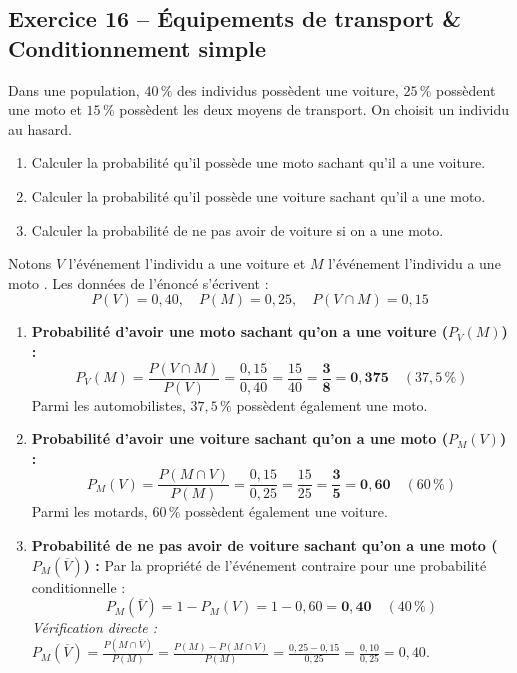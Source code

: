 \documentclass[11pt,a4paper]{article}
\begin{document}
\subsection*{Exercice 16 -- Équipements de transport \& Conditionnement simple}

Dans une population, $40\,\%$ des individus possèdent une voiture, $25\,\%$ possèdent une moto et $15\,\%$ possèdent les deux moyens de transport.
On choisit un individu au hasard.
\begin{enumerate}[label=\arabic*.]
    \item Calculer la probabilité qu'il possède une moto sachant qu'il a une voiture.
    \item Calculer la probabilité qu'il possède une voiture sachant qu'il a une moto.
    \item Calculer la probabilité de ne pas avoir de voiture si on a une moto.
\end{enumerate}

\begin{correctionbox}
Notons $V$ l'événement \og l'individu a une voiture \fg{} et $M$ l'événement \og l'individu a une moto \fg{}.
Les données de l'énoncé s'écrivent :
\[
P(V) = 0{,}40, \quad P(M) = 0{,}25, \quad P(V \cap M) = 0{,}15
\]
\begin{enumerate}[label=\arabic*.]
    \item \textbf{Probabilité d'avoir une moto sachant qu'on a une voiture ($P_V(M)$) :}
    \[
    P_V(M) = \frac{P(V \cap M)}{P(V)} = \frac{0{,}15}{0{,}40} = \frac{15}{40} = \mathbf{\frac{3}{8}} = \mathbf{0{,}375} \quad (37{,}5\,\%)
    \]
    Parmi les automobilistes, $37{,}5\,\%$ possèdent également une moto.

    \item \textbf{Probabilité d'avoir une voiture sachant qu'on a une moto ($P_M(V)$) :}
    \[
    P_M(V) = \frac{P(M \cap V)}{P(M)} = \frac{0{,}15}{0{,}25} = \frac{15}{25} = \mathbf{\frac{3}{5}} = \mathbf{0{,}60} \quad (60\,\%)
    \]
    Parmi les motards, $60\,\%$ possèdent également une voiture.

    \item \textbf{Probabilité de ne pas avoir de voiture sachant qu'on a une moto ($P_M(\overline{V})$) :}
    Par la propriété de l'événement contraire pour une probabilité conditionnelle :
    \[
    P_M(\overline{V}) = 1 - P_M(V) = 1 - 0{,}60 = \mathbf{0{,}40} \quad (40\,\%)
    \]
    \emph{Vérification directe :} $P_M(\overline{V}) = \frac{P(M \cap \overline{V})}{P(M)} = \frac{P(M) - P(M \cap V)}{P(M)} = \frac{0{,}25 - 0{,}15}{0{,}25} = \frac{0{,}10}{0{,}25} = 0{,}40$.
\end{enumerate}
\end{correctionbox}
\end{document}

